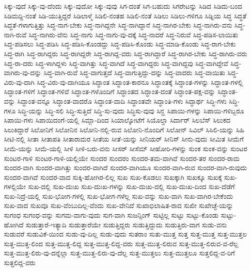 {ಸಿಕ್ಕು-ವುದೆ
ಸಿಕ್ಕು-ವು-ದೆಂದು
ಸಿಕ್ಕು-ವುದೋ
ಸಿಕ್ಕು-ವುವು
ಸಿಗ-ದಂತೆ
ಸಿಗ-ಬಹುದು
ಸಿಗರೇಟನ್ನು
ಸಿಡಿದ
ಸಿಡಿದು-ಬಂದ
ಸಿಡಿಮದ್ದಿ-ನಂತೆ
ಸಿಡಿ-ಯುತ್ತಿದ್ದರೆ
ಸಿಡಿಲಾಳ್ಮೆ
ಸಿಡಿಲಿ-ನಂತಹ
ಸಿಡಿಲಿ-ನಂತೆ
ಸಿಡಿಲು
ಸಿಡಿಲು-ಗಳಿಗೂ
ಸಿಡ್ನಿಯ
ಸಿದ್ಧ
ಸಿದ್ಧತೆ
ಸಿದ್ಧತೆ-ಗಳಾಗುತ್ತಿತ್ತು
ಸಿದ್ಧ-ನಾಗ-ಬೇಕು
ಸಿದ್ಧ-ನಾಗಿದ್ದನೇ
ಸಿದ್ಧ-ನಾಗಿದ್ದಾನೆ
ಸಿದ್ಧ-ನಾಗಿರ-ಬೇಕು
ಸಿದ್ಧ-ನಾಗಿರು-ವನು
ಸಿದ್ಧ-ನಾಗಿ-ರುವೆ
ಸಿದ್ಧ-ನಾಗಿರು-ವೆನು
ಸಿದ್ಧ-ನಾಗು
ಸಿದ್ಧ-ನಾಗು-ವು-ದಕ್ಕೆ
ಸಿದ್ಧ-ನಾದರೆ
ಸಿದ್ಧ-ನಿರುವೆ
ಸಿದ್ಧ-ಪಡಿಸ-ಲಾಯಿತು
ಸಿದ್ಧ-ಪಡಿಸಲು
ಸಿದ್ಧ-ಪಡಿಸಿ
ಸಿದ್ಧ-ಪಡಿಸಿ-ಕೊಂಡದ್ದು
ಸಿದ್ಧ-ಪಡಿಸಿ-ಕೊಂಡು
ಸಿದ್ಧ-ಮಾಡಿ-ಕೊಂಡು
ಸಿದ್ಧ-ರಾಗ-ಬೇಕು
ಸಿದ್ಧ-ರಾಗಿ
ಸಿದ್ಧ-ರಾಗಿದ್ದರು
ಸಿದ್ಧ-ರಾಗಿದ್ದರೇ
ಸಿದ್ಧ-ರಾಗಿದ್ದ-ವರು
ಸಿದ್ಧ-ರಾಗಿದ್ದಾರೆ
ಸಿದ್ಧ-ರಾಗಿರ-ಬೇಕು
ಸಿದ್ಧ-ರಾಗಿರು-ವರು
ಸಿದ್ಧ-ರಾ-ದರು
ಸಿದ್ಧ-ಳಾಗಿದ್ದಳು
ಸಿದ್ಧ-ವಾಗಿತ್ತು
ಸಿದ್ಧ-ವಾಗಿದೆ
ಸಿದ್ಧ-ವಾಗಿದ್ದರು
ಸಿದ್ಧ-ವಾಗಿದ್ದವು
ಸಿದ್ಧ-ವಾಗಿದ್ದೇವೆ
ಸಿದ್ಧ-ವಾಗಿರು-ವು-ದನ್ನು
ಸಿದ್ಧ-ವಾಗಿ-ರುವೆ
ಸಿದ್ಧ-ವಾಗುತ್ತದೆ
ಸಿದ್ಧ-ವಾಗುತ್ತಿದ್ದು-ದನ್ನು
ಸಿದ್ಧ-ವಾದರು
ಸಿದ್ಧ-ವಾಯಿತು
ಸಿದ್ಧ-ವಿರು-ವು-ದಾಗಿ
ಸಿದ್ಧ-ವಿರು-ವು-ದಾಗಿಯೂ
ಸಿದ್ಧಾಂತ
ಸಿದ್ಧಾಂತ-ಕಾರನೂ
ಸಿದ್ಧಾಂತಕ್ಕೆ
ಸಿದ್ಧಾಂತ-ಗಳನ್ನು
ಸಿದ್ಧಾಂತ-ಗಳಲ್ಲಿ
ಸಿದ್ಧಾಂತ-ಗಳಿಗೆ
ಸಿದ್ಧಾಂತ-ಗಳಿವೆ
ಸಿದ್ಧಾಂತ-ಗಳೊಂದಿಗೆ
ಸಿದ್ಧಾಂತದ
ಸಿದ್ಧಾಂತ-ದಂತೆ
ಸಿದ್ಧಾಂತ-ಪಕ್ಷ-ವನ್ನು
ಸಿದ್ಧಾಂತ-ವನ್ನು
ಸಿದ್ಧಾಂತ-ವನ್ನೂ
ಸಿದ್ಧಾಂತ-ವಾದರೊ
ಸಿದ್ಧಾಂತ-ವಾದಿ
ಸಿದ್ಧಾಂತವೇ
ಸಿದ್ಧಾಂತಿ-ಗಳು
ಸಿದ್ಧಾರ್ಥ
ಸಿದ್ಧಿ-ಗಳು
ಸಿದ್ಧಿ-ಗಳೂ
ಸಿದ್ಧಿ-ಯನ್ನು
ಸಿದ್ಧಿ-ಸಲಿ
ಸಿದ್ಧಿ-ಸುತ್ತಿದೆ
ಸಿದ್ಧಿ-ಸು-ವುದು
ಸಿದ್ಧಿಸು-ವುವು
ಸಿನ್ಹ
ಸಿಪಾಯಿ-ಗಳನ್ನು
ಸಿಪಾಯಿ-ಗಳಿಬ್ಬರೂ
ಸಿಪಾಯಿ-ಗಳು
ಸಿಪಾಯಿದಂಗೆ-ಯಲ್ಲಿ
ಸಿಮ್ಲಾ-ದಿಂದ
ಸಿಯಾಲ್ಕೋಟೆಗೆ
ಸಿಯೊಲ್ಡಾ
ಸಿರ್ದಾರ್
ಸಿಲಬೆಸ್
ಸಿಲುಕದ
ಸಿಲುಕಿದ್ದಾರೆ
ಸಿಲೋನಿಗೆ
ಸಿಲೋನಿನ
ಸಿಲೋನಿ-ನಲ್ಲಿ-ರುವ
ಸಿಲೋನಿ-ನೊಂದಿಗೆ
ಸಿಲೋನ್
ಸಿವಿಲ್
ಸಿಸಿಲಿ-ಯನ್ನು
ಸಿಹಿ
ಸೀಟಿ-ನಲ್ಲಿ
ಸೀತಾ
ಸೀತಾಪತಿ
ಸೀತಾರಾಮರ
ಸೀತೆಯ
ಸೀತೆ-ಯನ್ನು
ಸೀನಿಯರ್
ಸೀನಿಸ್
ಸೀನು-ವುದು
ಸೀಮಿತ
ಸೀಮೆಗೆ
ಸೀಮೆ-ಯನ್ನು
ಸೀಮೆ-ಯಲ್ಲಿ
ಸೀಳಿ
ಸೀಳಿ-ಬರು-ವನು
ಸೀಸರ್
ಸೀಸೆಮ್
ಸೀಹೋರಿ-ಗಳನ್ನು
ಸುಂಕ
ಸುಂಕ-ವನ್ನು
ಸುಂಟರ
ಸುಂಟರ-ಗಾಳಿ
ಸುಂಟರ-ಗಾಳಿ-ಯಲ್ಲಿಯೇ
ಸುಂದರ
ಸುಂದರಂ
ಸುಂದರ-ತಮ-ವಾಗಿವೆ
ಸುಂದರ-ತರ
ಸುಂದರ-ರಾಮ
ಸುಂದರ-ವಾಗಿ
ಸುಂದರ-ವಾಗಿತ್ತು
ಸುಂದರ-ವಾಗಿದೆ
ಸುಂದರ-ವಾಗಿಯೂ
ಸುಂದರ-ವಾಗಿ-ರುವ
ಸುಂದರ-ವಾಗಿ-ರುವುದು
ಸುಂದರ-ವಾಗಿವೆ
ಸುಂದರ-ವಾದ
ಸುಕ್ಕಿ-ಹೋಗಿರ-ಲಿಲ್ಲ
ಸುಖ
ಸುಖ-ಕೊಡಲು
ಸುಖಕ್ಕಾಗಿ
ಸುಖಕ್ಕೂ
ಸುಖಕ್ಕೆ
ಸುಖ-ಗಳಲ್ಲಿಯೇ
ಸುಖ-ದಲ್ಲಿ
ಸುಖ-ದುಃಖ
ಸುಖ-ದುಃಖ-ಗಳನ್ನು
ಸುಖ-ದುಃಖ-ದಲ್ಲಿ
ಸುಖ-ದುಃಖ-ದಿಂದ
ಸುಖ-ದೆಡೆಗೆ
ಸುಖ-ನಿದ್ರೆ-ಯಲ್ಲಿ
ಸುಖ-ಭೋಗ-ಗಳಲ್ಲಿ
ಸುಖ-ಭೋಗ-ಗಳೆಲ್ಲ
ಸುಖ-ವನ್ನು
ಸುಖ-ವಾಗಿ
ಸುಖ-ವಾಗಿರ-ಬೇಕೆಂದು
ಸುಖ-ವಾದ
ಸುಖವೂ
ಸುಖ-ವೆಂಬುದಿಲ್ಲ-ವೆಂದು
ಸುಖ-ವೇನಿದೆ
ಸುಖಾಭಿಲಾಷಿತ-ರಾದ
ಸುಖೀ
ಸುಖೇಚ್ಛೆ-ಯನ್ನು
ಸುಗಂಧ
ಸುಗಂಧ-ವನ್ನು
ಸುಗಮ-ವಾಗು-ವುದು
ಸುಗ-ವಾಗಿ
ಸುಜನ್ಸಿಂಗ್
ಸುಟ್ಟಿಲ್ಲ
ಸುಟ್ಟು
ಸುಟ್ಟು-ಕೊಂಡು
ಸುಟ್ಟು-ಹೋಗಿದೆ
ಸುಡುತ್ತಾರೆ-ಇತ್ಯಾದಿ
ಸುಡುತ್ತಾರೆಯೇ
ಸುಡುತ್ತಿದ್ದರು
ಸುಡುತ್ತಿದ್ದುದು
ಸುಡುತ್ತಿರು-ವಾಗ
ಸುಡು-ವನು
ಸುಡುವರೆ
ಸುಡುವಿಕೆ-ಯಿಂದ
ಸುಡು-ವು-ದಿಲ್ಲ
ಸುಡು-ವುದು
ಸುತರಾಂ
ಸುತು-ಮುತ್ತ
ಸುತ್ತ
ಸುತ್ತ-ಮುತ್ತ
ಸುತ್ತ-ಮುತ್ತಲ
ಸುತ್ತ-ಮುತ್ತ-ಲಿಂದ
ಸುತ್ತ-ಮುತ್ತ-ಲಿದ್ದ
ಸುತ್ತ-ಮುತ್ತ-ಲಿದ್ದ-ವರು
ಸುತ್ತ-ಮುತ್ತ-ಲಿರುವ
ಸುತ್ತ-ಮುತ್ತ-ಲಿರುವ-ವ-ರೆಲ್ಲ
ಸುತ್ತ-ಮುತ್ತ-ಲಿರು-ವು-ದನ್ನೆಲ್ಲಾ
ಸುತ್ತ-ಮುತ್ತ-ಲಿರು-ವು-ದೆಲ್ಲ
ಸುತ್ತ-ಮುತ್ತಲು
ಸುತ್ತ-ಮುತ್ತಲೂ
ಸುತ್ತಲಿದ್ದ-ವ-ರಿಗೆ
ಸುತ್ತಲಿದ್ದ-ವರು
}
